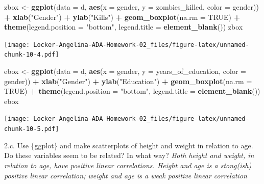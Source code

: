 \documentclass[]{article}
\newenvironment{Shaded}{\begin{snugshade}}{\end{snugshade}}
\newcommand{\KeywordTok}[1]{\textcolor[rgb]{0.13,0.29,0.53}{\textbf{#1}}}
\newcommand{\DataTypeTok}[1]{\textcolor[rgb]{0.13,0.29,0.53}{#1}}
\newcommand{\StringTok}[1]{\textcolor[rgb]{0.31,0.60,0.02}{#1}}
\newcommand{\OtherTok}[1]{\textcolor[rgb]{0.56,0.35,0.01}{#1}}
\newcommand{\OperatorTok}[1]{\textcolor[rgb]{0.81,0.36,0.00}{\textbf{#1}}}
\newcommand{\NormalTok}[1]{#1}
\begin{document}
\begin{Shaded}
\begin{Highlighting}[]
\NormalTok{zbox <-}\StringTok{ }\KeywordTok{ggplot}\NormalTok{(}\DataTypeTok{data =}\NormalTok{ d, }\KeywordTok{aes}\NormalTok{(}\DataTypeTok{x =}\NormalTok{ gender, }\DataTypeTok{y =}\NormalTok{ zombies_killed, }\DataTypeTok{color =}\NormalTok{ gender)) }\OperatorTok{+}\StringTok{ }\KeywordTok{xlab}\NormalTok{(}\StringTok{"Gender"}\NormalTok{) }\OperatorTok{+}\StringTok{ }\KeywordTok{ylab}\NormalTok{(}\StringTok{"Kills"}\NormalTok{) }\OperatorTok{+}\StringTok{ }\KeywordTok{geom_boxplot}\NormalTok{(}\DataTypeTok{na.rm =} \OtherTok{TRUE}\NormalTok{) }\OperatorTok{+}\StringTok{ }\KeywordTok{theme}\NormalTok{(}\DataTypeTok{legend.position =} \StringTok{"bottom"}\NormalTok{, }\DataTypeTok{legend.title =} \KeywordTok{element_blank}\NormalTok{())}
\NormalTok{zbox}
\end{Highlighting}
\end{Shaded}

\texttt{[image: Locker-Angelina-ADA-Homework-02\_files/figure-latex/unnamed-chunk-10-4.pdf]}

\begin{Shaded}
\begin{Highlighting}[]
\NormalTok{ebox <-}\StringTok{ }\KeywordTok{ggplot}\NormalTok{(}\DataTypeTok{data =}\NormalTok{ d, }\KeywordTok{aes}\NormalTok{(}\DataTypeTok{x =}\NormalTok{ gender, }\DataTypeTok{y =}\NormalTok{ years_of_education, }\DataTypeTok{color =}\NormalTok{ gender)) }\OperatorTok{+}\StringTok{ }\KeywordTok{xlab}\NormalTok{(}\StringTok{"Gender"}\NormalTok{) }\OperatorTok{+}\StringTok{ }\KeywordTok{ylab}\NormalTok{(}\StringTok{"Education"}\NormalTok{) }\OperatorTok{+}\StringTok{ }\KeywordTok{geom_boxplot}\NormalTok{(}\DataTypeTok{na.rm =} \OtherTok{TRUE}\NormalTok{) }\OperatorTok{+}\StringTok{ }\KeywordTok{theme}\NormalTok{(}\DataTypeTok{legend.position =} \StringTok{"bottom"}\NormalTok{, }\DataTypeTok{legend.title =} \KeywordTok{element_blank}\NormalTok{())}
\NormalTok{ebox}
\end{Highlighting}
\end{Shaded}

\texttt{[image: Locker-Angelina-ADA-Homework-02\_files/figure-latex/unnamed-chunk-10-5.pdf]}

2.c. Use \{ggplot\} and make scatterplots of height and weight in
relation to age. Do these variables seem to be related? In what way?
\emph{Both height and weight, in relation to age, have positive linear
correlations. Height and age is a stong(ish) positive linear
correlation; weight and age is a weak positive linear correlation}
\end{document}
